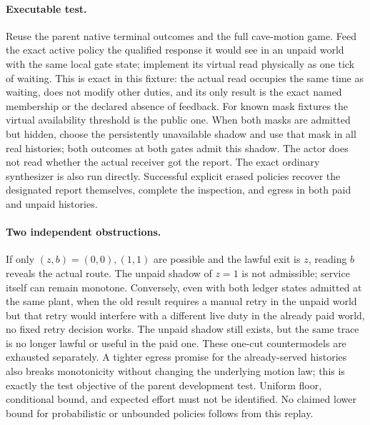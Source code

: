 \documentclass{article}
\begin{document}
\paragraph{Executable test.}
Reuse the parent native terminal outcomes and the full cave-motion
game. Feed the exact active policy the qualified response it would
see in an unpaid world with the same local gate state; implement
its virtual read physically as one tick of waiting. This is exact
in this fixture: the actual read occupies the same time as waiting,
does not modify other duties, and its only result is the exact
named membership or the declared absence of feedback. For known
mask fixtures the virtual availability threshold is the public
one. When both masks are admitted but hidden, choose the persistently
unavailable shadow and use that mask in all real histories; both
outcomes at both gates admit this shadow. The actor does not read
whether the actual receiver got the report. The exact ordinary
synthesizer is also run directly. Successful explicit erased
policies recover the designated report themselves, complete the
inspection, and egress in both paid and unpaid histories.

\paragraph{Two independent obstructions.}
If only $(z,b)=(0,0),(1,1)$ are possible and the lawful exit is $z$,
reading $b$ reveals the actual route. The unpaid shadow of $z=1$
is not admissible; service itself can remain monotone. Conversely,
even with both ledger states admitted at the same plant, when the
old result requires a manual retry in the unpaid world but that
retry would interfere with a different live duty in the already
paid world, no fixed retry decision works. The unpaid shadow still
exists, but the same trace is no longer lawful or useful in the
paid one. These one-cut countermodels are exhausted separately.
A tighter egress promise for the already-served histories also
breaks monotonicity without changing the underlying motion law;
this is exactly the test objective of the parent development
test. Uniform floor, conditional bound, and expected effort must
not be identified. No claimed lower bound for probabilistic or
unbounded policies follows from this replay.
\end{document}
